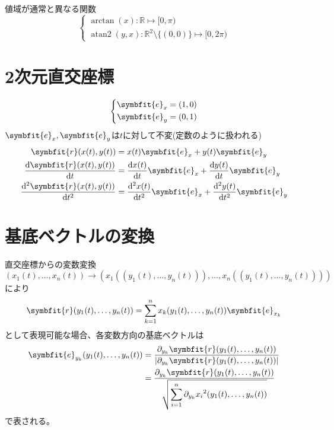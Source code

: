 \documentclass[12pt,oneside]{jlreq}
\DeclareMathOperator{\atantwo}{atan2}
\newcommand{\bm}[1]{\symbfit{#1}}
\begin{document}
値域が通常と異なる関数
\begin{equation*}
    \left\{
        \begin{gathered}
            \arctan(x) : \mathbb{R}\mapsto[0,\pi)\\
            \atantwo(y,x) : \mathbb{R}^2\setminus\{(0,0)\}\mapsto[0,2\pi)
        \end{gathered}
    \right.
\end{equation*}
\section{2次元直交座標}
\begin{gather*}
    \left\{
        \begin{aligned}
            \bm{e}_x&=\left(1,0\right)\\
            \bm{e}_y&=\left(0,1\right)
        \end{aligned}
    \right.
\end{gather*}
\(\bm{e}_x,\bm{e}_y\)は\(t\)に対して不変(定数のように扱われる)\\
\begin{align*}
\bm{r}(x(t),y(t))&=x(t)\bm{e}_x+y(t)\bm{e}_{y}\\
\odv{\bm{r}(x(t),y(t))}{t}&=\odv{x(t)}{t}\bm{e}_x+\odv{y(t)}{t}\bm{e}_{y}\\
\odv[2]{\bm{r}(x(t),y(t))}{t}&=\odv[2]{x(t)}{t}\bm{e}_x+\odv[2]{y(t)}{t}\bm{e}_{y}
\end{align*}
\section{基底ベクトルの変換}
直交座標からの変数変換
\[
(x_1(t),\dots,x_n(t))\to(x_1((y_1(t),\dots,y_n(t))),\dots,x_n((y_1(t),\dots,y_n(t))))
\]
により\[\bm{r}(y_1(t),\dots,y_n(t))=\displaystyle\sum_{k=1}^{n}x_k(y_1(t),\dots,y_n(t))\bm{e}_{x_k}\]として表現可能な場合、各変数方向の基底ベクトルは
\begin{align*}
    \bm{e}_{y_k}(y_1(t),\dots,y_n(t))&=\frac{\pdif{y_k}\bm{r}(y_1(t),\dots,y_n(t))}{\left|\pdif{y_k}\bm{r}(y_1(t),\dots,y_n(t))\right|}\\
    &=\frac{\pdif{y_k}\bm{r}(y_1(t),\dots,y_n(t))}{\sqrt{\displaystyle\sum_{i=1}^{n}\pdif{y_k}{x_i}^2(y_1(t),\dots,y_n(t))}}
\end{align*}
で表される。
\end{document}
